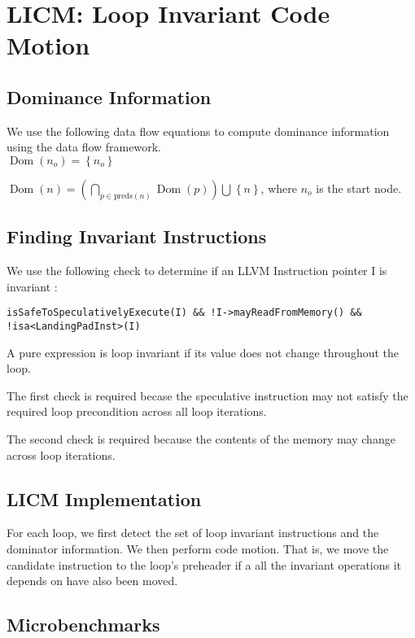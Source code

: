 \section{LICM: Loop Invariant Code Motion}

\subsection{Dominance Information}

We use the following data flow equations to compute dominance information using the
data flow framework. \\

$\operatorname{Dom}(n_o) = \left \{ n_o \right \}$

$\operatorname{Dom}(n) = \left ( \bigcap_{p \in \text{preds}(n)}^{} \operatorname{Dom}(p) \right ) \bigcup^{} \left \{ n \right \}$,
where $n_o$ is the start node.

\subsection{Finding Invariant Instructions}

We use the following check to determine if an LLVM Instruction pointer I is invariant :

\texttt{isSafeToSpeculativelyExecute(I) \&\& !I->mayReadFromMemory() \&\& !isa<LandingPadInst>(I)}

A pure expression is loop invariant if its value does not change throughout the loop. 

The first check is required becase the speculative instruction may not satisfy the required
loop precondition across all loop iterations.

The second check is required because the contents of the memory may change across loop iterations.

\subsection{LICM Implementation}

For each loop, we first detect the set of loop invariant instructions and the dominator information.
We then perform code motion. That is, we move the candidate instruction to the loop's preheader if a
all the invariant operations it depends on have also been moved.

\subsection{Microbenchmarks}

